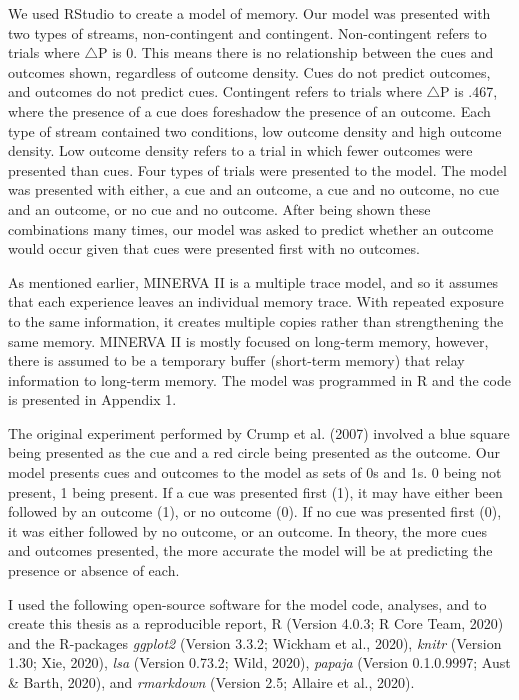 \documentclass[
  english,
  man,floatsintext]{apa6}
\begin{document}
We used RStudio to create a model of memory. Our model was presented with two types of streams, non-contingent and contingent. Non-contingent refers to trials where \(\triangle\)P is 0. This means there is no relationship between the cues and outcomes shown, regardless of outcome density. Cues do not predict outcomes, and outcomes do not predict cues. Contingent refers to trials where \(\triangle\)P is .467, where the presence of a cue does foreshadow the presence of an outcome. Each type of stream contained two conditions, low outcome density and high outcome density. Low outcome density refers to a trial in which fewer outcomes were presented than cues. Four types of trials were presented to the model. The model was presented with either, a cue and an outcome, a cue and no outcome, no cue and an outcome, or no cue and no outcome. After being shown these combinations many times, our model was asked to predict whether an outcome would occur given that cues were presented first with no outcomes.

As mentioned earlier, MINERVA II is a multiple trace model, and so it assumes that each experience leaves an individual memory trace. With repeated exposure to the same information, it creates multiple copies rather than strengthening the same memory. MINERVA II is mostly focused on long-term memory, however, there is assumed to be a temporary buffer (short-term memory) that relay information to long-term memory. The model was programmed in R and the code is presented in Appendix 1.

The original experiment performed by Crump et al. (2007) involved a blue square being presented as the cue and a red circle being presented as the outcome. Our model presents cues and outcomes to the model as sets of 0s and 1s. 0 being not present, 1 being present. If a cue was presented first (1), it may have either been followed by an outcome (1), or no outcome (0). If no cue was presented first (0), it was either followed by no outcome, or an outcome. In theory, the more cues and outcomes presented, the more accurate the model will be at predicting the presence or absence of each.

I used the following open-source software for the model code, analyses, and to create this thesis as a reproducible report, R (Version 4.0.3; R Core Team, 2020) and the R-packages \emph{ggplot2} (Version 3.3.2; Wickham et al., 2020), \emph{knitr} (Version 1.30; Xie, 2020), \emph{lsa} (Version 0.73.2; Wild, 2020), \emph{papaja} (Version 0.1.0.9997; Aust \& Barth, 2020), and \emph{rmarkdown} (Version 2.5; Allaire et al., 2020).
\end{document}
